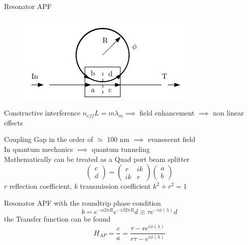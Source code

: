 \documentclass{beamer}
\begin{document}
\begin{frame}[plain]{Resonator APF}
\begin{figure}
\centering
\includegraphics[width =.7\textwidth]{APF}
\end{figure}
\vspace{2em}
Constructive interference $n_{eff} L = m \lambda_m \implies$ field enhancement $\implies$ non linear effects
\end{frame}

\begin{frame}[plain]{Coupling}
Gap in the order of $\simeq$ 100 nm $\implies$ evanescent field \\
In quantum mechanics $\implies$ quantum tunneling\newline
\\Mathematically can be treated as a Quad port beam splitter
\begin{equation}\begin{pmatrix}c \\ d \end{pmatrix} = \begin{pmatrix}r &ik\\ ik &r \end{pmatrix}
 \begin{pmatrix}a\\b \end{pmatrix}\end{equation}
$r$ reflection coefficient, $k$ transmission coefficient $k^2+r^2=1$
\end{frame}

\begin{frame}[plain]{Resonator APF}
with the roundtrip phase condition \[b = e^{-\alpha 2\pi R} e^{-i\beta 2\pi R}d \equiv\tau e^{-i\phi(\lambda)}d\] the Transfer function can be found
\begin{equation}H_{AP} = \frac{c}{a} = \frac{\tau - re^{i\phi(\lambda)}}{r\tau -e^{i\phi(\lambda)}}\end{equation}
\end{frame}
\end{document}
